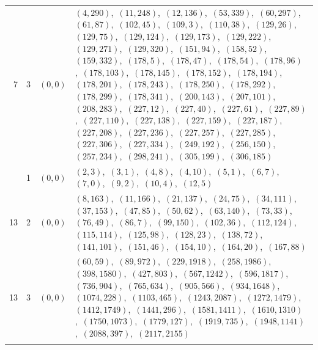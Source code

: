 \documentclass[11pt]{article}
\begin{document}
\begin{longtable}{@{}rrl>{\raggedright\arraybackslash}p{}@{}}
7 & 3 & $(0,0)$ & $(4,290)$,\allowbreak\ $(11,248)$,\allowbreak\ $(12,136)$,\allowbreak\ $(53,339)$,\allowbreak\ $(60,297)$,\allowbreak\ $(61,87)$,\allowbreak\ $(102,45)$,\allowbreak\ $(109,3)$,\allowbreak\ $(110,38)$,\allowbreak\ $(129,26)$,\allowbreak\ $(129,75)$,\allowbreak\ $(129,124)$,\allowbreak\ $(129,173)$,\allowbreak\ $(129,222)$,\allowbreak\ $(129,271)$,\allowbreak\ $(129,320)$,\allowbreak\ $(151,94)$,\allowbreak\ $(158,52)$,\allowbreak\ $(159,332)$,\allowbreak\ $(178,5)$,\allowbreak\ $(178,47)$,\allowbreak\ $(178,54)$,\allowbreak\ $(178,96)$,\allowbreak\ $(178,103)$,\allowbreak\ $(178,145)$,\allowbreak\ $(178,152)$,\allowbreak\ $(178,194)$,\allowbreak\ $(178,201)$,\allowbreak\ $(178,243)$,\allowbreak\ $(178,250)$,\allowbreak\ $(178,292)$,\allowbreak\ $(178,299)$,\allowbreak\ $(178,341)$,\allowbreak\ $(200,143)$,\allowbreak\ $(207,101)$,\allowbreak\ $(208,283)$,\allowbreak\ $(227,12)$,\allowbreak\ $(227,40)$,\allowbreak\ $(227,61)$,\allowbreak\ $(227,89)$,\allowbreak\ $(227,110)$,\allowbreak\ $(227,138)$,\allowbreak\ $(227,159)$,\allowbreak\ $(227,187)$,\allowbreak\ $(227,208)$,\allowbreak\ $(227,236)$,\allowbreak\ $(227,257)$,\allowbreak\ $(227,285)$,\allowbreak\ $(227,306)$,\allowbreak\ $(227,334)$,\allowbreak\ $(249,192)$,\allowbreak\ $(256,150)$,\allowbreak\ $(257,234)$,\allowbreak\ $(298,241)$,\allowbreak\ $(305,199)$,\allowbreak\ $(306,185)$\\
\addlinespace[3pt]
13 & 1 & $(0,0)$ & $(2,3)$,\allowbreak\ $(3,1)$,\allowbreak\ $(4,8)$,\allowbreak\ $(4,10)$,\allowbreak\ $(5,1)$,\allowbreak\ $(6,7)$,\allowbreak\ $(7,0)$,\allowbreak\ $(9,2)$,\allowbreak\ $(10,4)$,\allowbreak\ $(12,5)$\\
13 & 2 & $(0,0)$ & $(8,163)$,\allowbreak\ $(11,166)$,\allowbreak\ $(21,137)$,\allowbreak\ $(24,75)$,\allowbreak\ $(34,111)$,\allowbreak\ $(37,153)$,\allowbreak\ $(47,85)$,\allowbreak\ $(50,62)$,\allowbreak\ $(63,140)$,\allowbreak\ $(73,33)$,\allowbreak\ $(76,49)$,\allowbreak\ $(86,7)$,\allowbreak\ $(99,150)$,\allowbreak\ $(102,36)$,\allowbreak\ $(112,124)$,\allowbreak\ $(115,114)$,\allowbreak\ $(125,98)$,\allowbreak\ $(128,23)$,\allowbreak\ $(138,72)$,\allowbreak\ $(141,101)$,\allowbreak\ $(151,46)$,\allowbreak\ $(154,10)$,\allowbreak\ $(164,20)$,\allowbreak\ $(167,88)$\\
13 & 3 & $(0,0)$ & $(60,59)$,\allowbreak\ $(89,972)$,\allowbreak\ $(229,1918)$,\allowbreak\ $(258,1986)$,\allowbreak\ $(398,1580)$,\allowbreak\ $(427,803)$,\allowbreak\ $(567,1242)$,\allowbreak\ $(596,1817)$,\allowbreak\ $(736,904)$,\allowbreak\ $(765,634)$,\allowbreak\ $(905,566)$,\allowbreak\ $(934,1648)$,\allowbreak\ $(1074,228)$,\allowbreak\ $(1103,465)$,\allowbreak\ $(1243,2087)$,\allowbreak\ $(1272,1479)$,\allowbreak\ $(1412,1749)$,\allowbreak\ $(1441,296)$,\allowbreak\ $(1581,1411)$,\allowbreak\ $(1610,1310)$,\allowbreak\ $(1750,1073)$,\allowbreak\ $(1779,127)$,\allowbreak\ $(1919,735)$,\allowbreak\ $(1948,1141)$,\allowbreak\ $(2088,397)$,\allowbreak\ $(2117,2155)$\\
\addlinespace[3pt]
\end{longtable}
\endgroup
\end{document}
